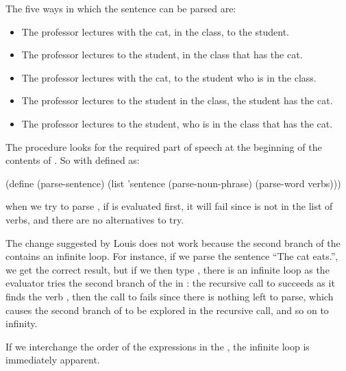 \begin{exe}[4.45]
    The five ways in which the sentence can be parsed are:
    \begin{itemize}
        \item The professor lectures with the cat, in the class, to the student.
        \item The professor lectures to the student, in the class that has the 
            cat.
        \item The professor lectures with the cat, to the student who is in the 
            class.
        \item The professor lectures to the student in the class, the student 
            has the cat.
        \item The professor lectures to the student, who is in the class that 
            has the cat.
    \end{itemize}
\end{exe}

\begin{exe}[4.46]
    The  procedure looks for the required part of speech at the 
    beginning of the contents of . So with 
     defined as:
    \begin{cscm}
        (define (parse-sentence)
          (list 'sentence
                (parse-noun-phrase)
                (parse-word verbs)))
    \end{cscm}
    when we try to parse , if  is 
    evaluated first, it will fail since  is not in the list of verbs, 
    and there are no alternatives to try.
\end{exe}

\begin{exe}[4.47]
    The change suggested by Louis does not work because the second branch of the 
     contains an infinite loop. For instance, if we parse the sentence 
    “The cat eats.”, we get the correct result, but if we then type 
    , there is an infinite loop as the evaluator tries the 
    second branch of the  in : the recursive 
    call to  succeeds as it finds the verb , 
    then the call to  fails since there is 
    nothing left to parse, which causes the second branch of  to be 
    explored in the recursive call, and so on to infinity.

    If we interchange the order of the expressions in the , the 
    infinite loop is immediately apparent.
\end{exe}

